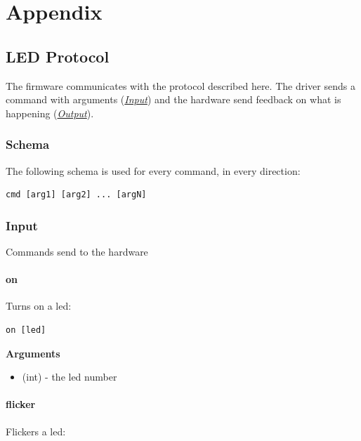 \part{Appendix}

\chapter{LED Protocol}
\label{appendix/led-protocol:led-protocol}\label{appendix/led-protocol::doc}
The firmware communicates with the protocol described here. The driver sends a command with arguments ({\hyperref[appendix/led-protocol:protocol-input]{\emph{Input}}}) and the hardware send feedback on what is happening ({\hyperref[appendix/led-protocol:protocol-output]{\emph{Output}}}).


\section{Schema}
\label{appendix/led-protocol:schema}
The following schema is used for every command, in every direction:

\begin{verbatim}
cmd [arg1] [arg2] ... [argN]
\end{verbatim}


\section{Input}
\label{appendix/led-protocol:input}\label{appendix/led-protocol:protocol-input}
Commands send to the hardware


\subsection{on}
\label{appendix/led-protocol:on}\label{appendix/led-protocol:protocol-input-on}
Turns on a led:

\begin{verbatim}
on [led]
\end{verbatim}

\textbf{Arguments}
\begin{itemize}
\item {} 
 (int) - the led number

\end{itemize}


\subsection{flicker}
\label{appendix/led-protocol:flicker}\label{appendix/led-protocol:protocol-input-flicker}
Flickers a led:

